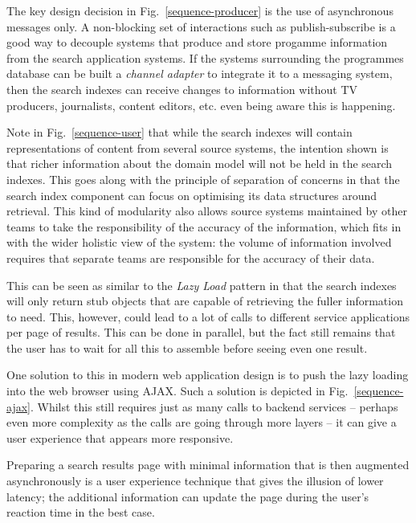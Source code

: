 \documentclass{llncs}
\begin{document}
The key design decision in Fig.~\ref{sequence-producer} is the use of
asynchronous messages only. A non-blocking set of interactions such as
publish-subscribe\cite{hohpe2004enterprise} is a good way to decouple
systems that produce and store progamme information from the search
application systems. If the systems surrounding the programmes database
can be built a \emph{channel adapter}\cite{hohpe2004enterprise} to integrate
it to a messaging system, then the search indexes can receive changes to
information without TV producers, journalists, content
editors, etc. even being aware this is happening.

Note in Fig.~\ref{sequence-user} that while the search indexes
will contain representations of content
from several source systems, the intention shown is that richer information
about the domain model will not be held in the search indexes. This goes
along with the principle of separation of concerns\cite{dijkstra1982role}
in that the search index component can focus on optimising its data
structures around retrieval. This kind of modularity also allows source
systems maintained by other teams to take the responsibility of the
accuracy of the information, which fits in with the wider holistic view
of the system: the volume of information involved requires that
separate teams are responsible for the accuracy of their data.

This can be seen as similar to the \emph{Lazy Load} pattern
\cite{fowler2002patterns} in that the search indexes will only return
stub objects that are capable of retrieving the fuller information
to need. This, however, could lead to a lot of calls to different
service applications per page of results. This can be done in parallel, but
the fact still remains that the user has to wait for all this to
assemble before seeing even one result.

One solution to this in modern web application design is to
push the lazy loading into the web browser using AJAX\cite{garrett2005ajax}.
Such a solution is depicted in Fig.~\ref{sequence-ajax}. Whilst
this still requires just as many calls to backend services --
perhaps even more complexity as the calls are going through
more layers -- it can give a user experience that appears more responsive.

Preparing a search results page with minimal information that is then
augmented asynchronously is a user experience technique that gives the
illusion of lower latency; the additional information can update the page
during the user's reaction time in the best case.
\end{document}
